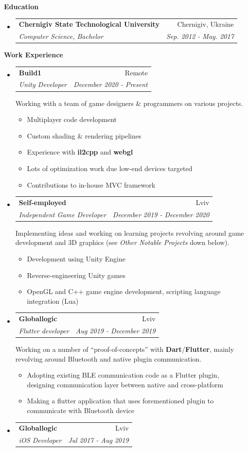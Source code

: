 \documentclass[letterpaper,11pt]{article}
\makeatletter
\newcommand{\resitem}[1]{\item #1 \vspace{-2pt}}
\newcommand{\resheading}[1]{{\vspace{.2in} \large \colorbox{title_bg}{\begin{minipage}{\textwidth}{\textbf{#1 \vphantom{p\^{E}}}}\end{minipage}}}}
\newcommand{\ressubheading}[4]{
\begin{tabular*}{7.1in}{l@{\extracolsep{\fill}}r}
		\textbf{#1} & #2 \\
		\textit{#3} & \textit{#4} \\
\end{tabular*}\vspace{-6pt}}
\makeatother
\begin{document}
\resheading{Education}
\begin{itemize}
\item
	\ressubheading{Chernigiv State Technological University}{Chernigiv, Ukraine}{Computer Science, Bachelor}{Sep. 2012 - May. 2017}
\end{itemize}

\resheading{Work Experience}
\begin{itemize}
	\item
		\ressubheading{Build1}{Remote}{Unity Developer}{December 2020 - Present}

		Working with a team of game designers \& programmers on various projects.
		\begin{itemize}
				\resitem{Multiplayer code development}
				\resitem{Custom shading \& rendering pipelines}
				\resitem{Experience with \textbf{il2cpp} and \textbf{webgl}}
				\resitem{Lots of optimization work due low-end devices targeted}
				\resitem{Contributions to in-house MVC framework}
		\end{itemize}

	\item
		\ressubheading{Self-employed}{Lviv}{Independent Game Developer}{December 2019 - December 2020}

		Implementing ideas and working on learning projects revolving around game development and 3D graphics (see \textit{Other Notable Projects} down below).
		\begin{itemize}
				\resitem{Development using Unity Engine}
				\resitem{Reverse-engineering Unity games}
				\resitem{OpenGL and C++ game engine development, scripting language integration (Lua)}
		\end{itemize}

	\item
		\ressubheading{Globallogic}{Lviv}{Flutter developer}{Aug 2019 - December 2019}
		
		Working on a number of ``proof-of-concepts'' with \textbf{Dart}/\textbf{Flutter}, mainly revolving around Bluetooth and native plugin communication.
		\begin{itemize}
				\resitem{Adopting existing BLE communication code as a Flutter plugin, designing communication layer between native and cross-platform}
				\resitem{Making a flutter application that uses forementioned plugin to communicate with Bluetooth device}
		\end{itemize}

	\pagebreak

	\item
		\ressubheading{Globallogic}{Lviv}{iOS Developer}{Jul 2017 - Aug 2019}


\end{itemize}
\end{document}
